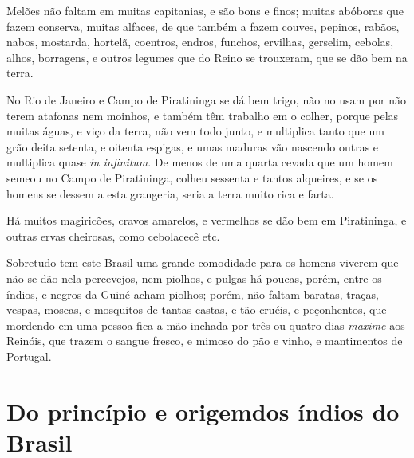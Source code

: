 \begin{linenumbers}
 Melões não faltam em muitas capitanias, e são bons e
finos; muitas abóboras que fazem conserva, muitas alfaces, de que
também a fazem couves, pepinos, rabãos, nabos, mostarda, hortelã,
coentros, endros, funchos, ervilhas, gerselim, cebolas, alhos,
borragens, e outros legumes que do Reino se trouxeram, que se dão bem
na terra.

 No Rio de Janeiro e Campo de Piratininga se dá bem
trigo, não no usam por não terem atafonas nem moinhos, e também têm
trabalho em o colher, porque pelas muitas águas, e viço da terra, não
vem todo junto, e multiplica tanto que um grão deita setenta, e oitenta
espigas, e umas maduras vão nascendo outras e multiplica quase
\textit{in infinitum}. De menos de uma quarta cevada que um homem semeou no Campo
de Piratininga, colheu sessenta e tantos alqueires, e se os homens se
dessem a esta grangeria, seria a terra muito rica e farta.

 Há muitos magiricões, cravos amarelos, e
vermelhos se dão bem em Piratininga, e outras ervas cheirosas, como
cebolacecê etc.

 Sobretudo tem este Brasil uma grande comodidade para os homens viverem
que não se dão nela percevejos, nem piolhos, e pulgas há poucas, porém,
entre os índios, e negros da Guiné acham piolhos; porém, não faltam
baratas, traças, vespas, moscas, e mosquitos de tantas castas, e tão
cruéis, e peçonhentos, que mordendo em uma pessoa fica a mão inchada
por três ou quatro dias \textit{maxime} aos Reinóis, que trazem o sangue fresco,
e mimoso do pão e vinho, e mantimentos de Portugal.

\end{linenumbers}

\chapter[Do princípio e origem dos índios do Brasil e de seus costumes, 
adoração e cerimônias \medskip]{Do princípio e origem\break dos índios do Brasil}

